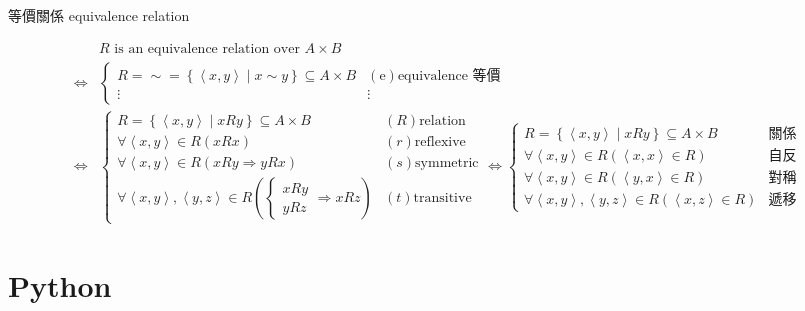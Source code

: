 \documentclass[
]{book}
\theoremstyle{definition}
\theoremstyle{definition}
\theoremstyle{definition}
\theoremstyle{definition}
\theoremstyle{remark}
\begin{document}
\begin{CJK}{UTF8}{bsmi}等價關係 equivalence relation \label{def:equivalence-relation}
\end{CJK}
\begin{CJK}{UTF8}{bsmi}
\begin{align*}
 & R\text{ is an equivalence relation over }A\times B\\
\Leftrightarrow & \begin{cases}
R=\sim=\left\{ \left\langle x,y\right\rangle \middle|x\sim y\right\} \subseteq A\times B & \left(\text{e}\right)\text{equivalence 等價}\\
\vdots & \vdots
\end{cases}\\
\Leftrightarrow & \begin{cases}
R=\left\{ \left\langle x,y\right\rangle \middle|xRy\right\} \subseteq A\times B & \left(R\right)\text{relation}\\
\forall\left\langle x,y\right\rangle \in R\left(xRx\right) & \left(r\right)\text{reflexive}\\
\forall\left\langle x,y\right\rangle \in R\left(xRy\Rightarrow yRx\right) & \left(s\right)\text{symmetric}\\
\forall\left\langle x,y\right\rangle ,\left\langle y,z\right\rangle \in R\left(\begin{cases}
xRy\\
yRz
\end{cases}\Rightarrow xRz\right) & \left(t\right)\text{transitive}
\end{cases}\Leftrightarrow\begin{cases}
R=\left\{ \left\langle x,y\right\rangle \middle|xRy\right\} \subseteq A\times B & \text{關係}\\
\forall\left\langle x,y\right\rangle \in R\left(\left\langle x,x\right\rangle \in R\right) & \text{自反}\\
\forall\left\langle x,y\right\rangle \in R\left(\left\langle y,x\right\rangle \in R\right) & \text{對稱}\\
\forall\left\langle x,y\right\rangle ,\left\langle y,z\right\rangle \in R\left(\left\langle x,z\right\rangle \in R\right) & \text{遞移}
\end{cases}
\end{align*}
\end{CJK}

\chapter{Python}\label{python}
\end{document}
